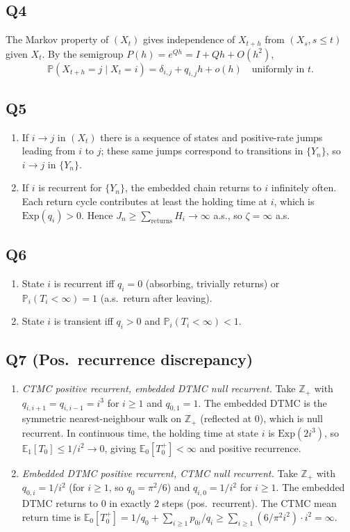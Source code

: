 \documentclass[11pt]{article}
\newcommand{\PP}{\mathbb{P}}
\newcommand{\EE}{\mathbb{E}}
\newcommand{\1}{\mathbf{1}}
\begin{document}
\subsection*{Q4}
The Markov property of $(X_t)$ gives independence of $X_{t+h}$ from $(X_s,s\le t)$ given $X_t$.  By the semigroup $P(h)=e^{Qh}=I+Qh+O(h^2)$,
\[
\PP(X_{t+h}=j\mid X_t=i)=\delta_{i,j}+q_{i,j}h+o(h)\quad\text{uniformly in }t.
\]

\subsection*{Q5}
\begin{enumerate}[label=(\alph*)]
\item If $i\to j$ in $(X_t)$ there is a sequence of states and positive-rate jumps leading from $i$ to $j$; these same jumps correspond to transitions in $\{Y_n\}$, so $i\to j$ in $\{Y_n\}$.
\item If $i$ is recurrent for $\{Y_n\}$, the embedded chain returns to $i$ infinitely often.  Each return cycle contributes at least the holding time at $i$, which is $\mathrm{Exp}(q_i)>0$.  Hence $J_n\ge\sum_{\text{returns}}H_i\to\infty$ a.s., so $\zeta=\infty$ a.s.
\end{enumerate}

\subsection*{Q6}
\begin{enumerate}[label=(\alph*)]
\item State $i$ is recurrent iff $q_i=0$ (absorbing, trivially returns) or $\PP_i(T_i<\infty)=1$ (a.s.\ return after leaving).
\item State $i$ is transient iff $q_i>0$ and $\PP_i(T_i<\infty)<1$.
\end{enumerate}

\subsection*{Q7 (Pos.\ recurrence discrepancy)}
\begin{enumerate}[label=(\alph*)]
\item \emph{CTMC positive recurrent, embedded DTMC null recurrent.}
Take $\mathbb{Z}_+$ with $q_{i,i+1}=q_{i,i-1}=i^3$ for $i\ge1$ and $q_{0,1}=1$.  The embedded DTMC is the symmetric nearest-neighbour walk on $\mathbb{Z}_+$ (reflected at $0$), which is null recurrent.  In continuous time, the holding time at state $i$ is $\mathrm{Exp}(2i^3)$, so $\EE_1[T_0]\le 1/i^2\to0$, giving $\EE_0[T_0^+]<\infty$ and positive recurrence.
\item \emph{Embedded DTMC positive recurrent, CTMC null recurrent.}
Take $\mathbb{Z}_+$ with $q_{0,i}=1/i^2$ (for $i\ge1$, so $q_0=\pi^2/6$) and $q_{i,0}=1/i^2$ for $i\ge1$.  The embedded DTMC returns to $0$ in exactly $2$ steps (pos.\ recurrent).  The CTMC mean return time is $\EE_0[T_0^+]=1/q_0+\sum_{i\ge1}p_{0i}/q_i\ge\sum_{i\ge1}(6/\pi^2 i^2)\cdot i^2=\infty$.
\end{enumerate}
\end{document}
